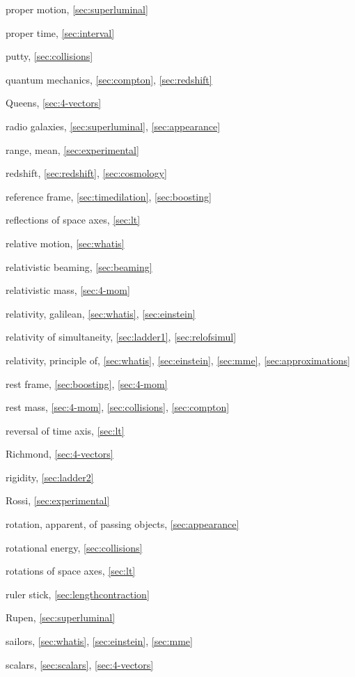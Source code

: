 \begin{theindex}
\item proper motion, \ref{sec:superluminal}
\item proper time, \ref{sec:interval}
\item putty, \ref{sec:collisions}
\item quantum mechanics, \ref{sec:compton}, \ref{sec:redshift}
\item Queens, \ref{sec:4-vectors}
\item radio galaxies, \ref{sec:superluminal}, \ref{sec:appearance}
\item range, mean, \ref{sec:experimental}
\item redshift, \ref{sec:redshift}, \ref{sec:cosmology}
\item reference frame, \ref{sec:timedilation}, \ref{sec:boosting}
\item reflections of space axes, \ref{sec:lt}
\item relative motion, \ref{sec:whatis}
\item relativistic beaming, \ref{sec:beaming}
\item relativistic mass, \ref{sec:4-mom}
\item relativity, galilean, \ref{sec:whatis}, \ref{sec:einstein}
\item relativity of simultaneity, \ref{sec:ladder1}, \ref{sec:relofsimul}
\item relativity, principle of, \ref{sec:whatis}, \ref{sec:einstein},
	\ref{sec:mme}, \ref{sec:approximations}
\item rest frame, \ref{sec:boosting}, \ref{sec:4-mom}
\item rest mass, \ref{sec:4-mom}, \ref{sec:collisions}, \ref{sec:compton}
\item reversal of time axis, \ref{sec:lt}
\item Richmond, \ref{sec:4-vectors}
\item rigidity, \ref{sec:ladder2}
\item Rossi, \ref{sec:experimental}
\item rotation, apparent, of passing objects, \ref{sec:appearance}
\item rotational energy, \ref{sec:collisions}
\item rotations of space axes, \ref{sec:lt}
\item ruler stick, \ref{sec:lengthcontraction}
\item Rupen, \ref{sec:superluminal}
\item sailors, \ref{sec:whatis}, \ref{sec:einstein}, \ref{sec:mme}
\item scalars, \ref{sec:scalars}, \ref{sec:4-vectors}

\end{theindex}
